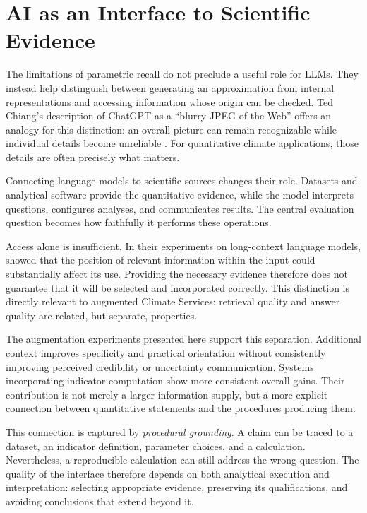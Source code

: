 \section{AI as an Interface to Scientific Evidence}

The limitations of parametric recall do not preclude a useful role for LLMs. They instead help distinguish between generating an approximation from internal representations and accessing information whose origin can be checked. Ted Chiang's description of ChatGPT as a ``blurry JPEG of the Web'' offers an analogy for this distinction: an overall picture can remain recognizable while individual details become unreliable \citep{chiang_chatgpt_2023}. For quantitative climate applications, those details are often precisely what matters.

Connecting language models to scientific sources changes their role. Datasets and analytical software provide the quantitative evidence, while the model interprets questions, configures analyses, and communicates results. The central evaluation question becomes how faithfully it performs these operations.

Access alone is insufficient. In their experiments on long-context language models, \citet{liu_lost_2024} showed that the position of relevant information within the input could substantially affect its use. Providing the necessary evidence therefore does not guarantee that it will be selected and incorporated correctly. This distinction is directly relevant to augmented Climate Services: retrieval quality and answer quality are related, but separate, properties.

The augmentation experiments presented here support this separation. Additional context improves specificity and practical orientation without consistently improving perceived credibility or uncertainty communication. Systems incorporating indicator computation show more consistent overall gains. Their contribution is not merely a larger information supply, but a more explicit connection between quantitative statements and the procedures producing them.

This connection is captured by \emph{procedural grounding}. A claim can be traced to a dataset, an indicator definition, parameter choices, and a calculation. Nevertheless, a reproducible calculation can still address the wrong question. The quality of the interface therefore depends on both analytical execution and interpretation: selecting appropriate evidence, preserving its qualifications, and avoiding conclusions that extend beyond it.

